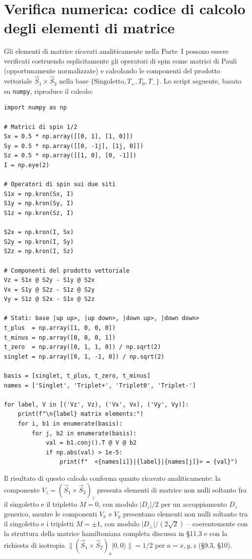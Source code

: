 \documentclass[11pt,a4paper]{article}
\begin{document}
\appendix
\section{Verifica numerica: codice di calcolo degli elementi di matrice}

Gli elementi di matrice ricavati analiticamente nella Parte~I possono essere verificati
costruendo esplicitamente gli operatori di spin come matrici di Pauli (opportunamente
normalizzate) e calcolando le componenti del prodotto vettoriale $\vec S_1\times\vec
S_2$ nella base $\{\text{Singoletto},T_+,T_0,T_-\}$. Lo script seguente, basato su
\texttt{numpy}, riproduce il calcolo:

{\small
\begin{verbatim}
import numpy as np

# Matrici di spin 1/2
Sx = 0.5 * np.array([[0, 1], [1, 0]])
Sy = 0.5 * np.array([[0, -1j], [1j, 0]])
Sz = 0.5 * np.array([[1, 0], [0, -1]])
I = np.eye(2)

# Operatori di spin sui due siti
S1x = np.kron(Sx, I)
S1y = np.kron(Sy, I)
S1z = np.kron(Sz, I)

S2x = np.kron(I, Sx)
S2y = np.kron(I, Sy)
S2z = np.kron(I, Sz)

# Componenti del prodotto vettoriale
Vz = S1x @ S2y - S1y @ S2x
Vx = S1y @ S2z - S1z @ S2y
Vy = S1z @ S2x - S1x @ S2z

# Stati: base |up up>, |up down>, |down up>, |down down>
t_plus  = np.array([1, 0, 0, 0])
t_minus = np.array([0, 0, 0, 1])
t_zero  = np.array([0, 1, 1, 0]) / np.sqrt(2)
singlet = np.array([0, 1, -1, 0]) / np.sqrt(2)

basis = [singlet, t_plus, t_zero, t_minus]
names = ['Singlet', 'Triplet+', 'Triplet0', 'Triplet-']

for label, V in [('Vz', Vz), ('Vx', Vx), ('Vy', Vy)]:
    print(f"\n{label} matrix elements:")
    for i, b1 in enumerate(basis):
        for j, b2 in enumerate(basis):
            val = b1.conj().T @ V @ b2
            if np.abs(val) > 1e-5:
                print(f"  <{names[i]}|{label}|{names[j]}> = {val}")
\end{verbatim}
}

Il risultato di questo calcolo conferma quanto ricavato analiticamente: la componente
$V_z=(\vec S_1\times\vec S_2)_z$ presenta elementi di matrice non nulli soltanto fra il
singoletto e il tripletto $M=0$, con modulo $|D_z|/2$ per un accoppiamento $D_z$
generico, mentre le componenti $V_x$ e $V_y$ presentano elementi non nulli soltanto tra
il singoletto e i tripletti $M=\pm1$, con modulo $|D_\perp|/(2\sqrt2)$ -- coerentemente
con la struttura della matrice hamiltoniana completa discussa in \S11.3 e con la
richiesta di isotropia $\|(\vec S_1\times\vec S_2)_a|0,0\rangle\|=1/2$ per $a=x,y,z$
(§9.3, §10).
\end{document}

